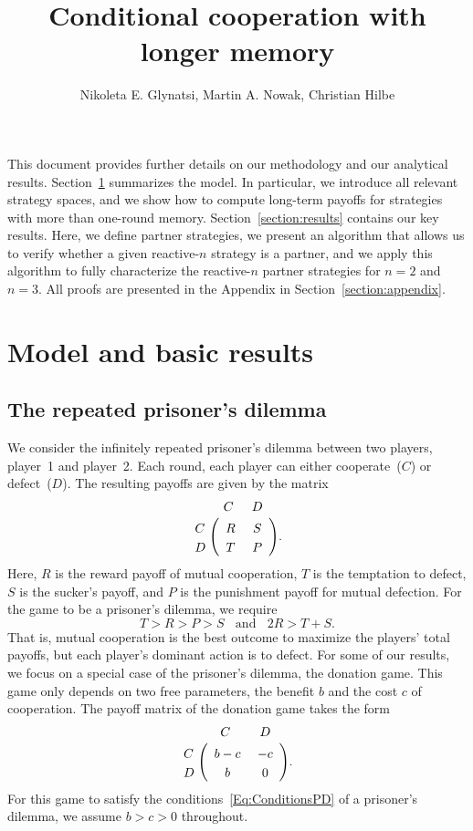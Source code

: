 \documentclass[9pt,twoside,lineno]{pnas-new}
\title{Conditional cooperation with longer memory}
\author{Nikoleta E. Glynatsi, Martin A. Nowak, Christian Hilbe}
\theoremstyle{plainCl1}
\theoremstyle{plainCl2}
\begin{document}
\maketitle

\SItext

This document provides further details on our methodology and our analytical
results.
Section~\ref{section:model} summarizes the model. 
In particular, we introduce all relevant strategy spaces, 
and we show how to compute long-term payoffs for strategies with more than one-round memory. 
Section~\ref{section:results} contains our key results. 
Here, we define partner strategies, we present an algorithm that allows us to verify whether a given reactive-$n$ strategy is a partner, and we apply this algorithm to fully characterize the reactive-$n$ partner strategies for $n\!=\!2$ and $n\!=\!3$.
All proofs are presented in the Appendix in Section~\ref{section:appendix}.

\section{Model and basic results}\label{section:model}

\subsection{The repeated prisoner's dilemma}


We consider the infinitely repeated prisoner's dilemma between two players, player~1 and player~2.
Each round, each player can either cooperate~($C$) or defect~($D$). 
The resulting payoffs are given by the matrix 
\begin{align}\label{Eq:PrisonerDilemma}
  \bordermatrix{%
    & C & D \cr
    C &\ R &\ S\  \cr
    D &\ T &\ P\ \cr
  }.
\end{align}
Here, $R$ is the reward payoff of mutual cooperation, $T$ is the temptation to defect, $S$ is the sucker's payoff, and $P$ is the punishment payoff for mutual defection. For the game to be a prisoner's dilemma, we require
\begin{equation} \label{Eq:ConditionsPD}
 T > R > P > S ~~~~\text{and}~~~~ 2 R > T \!+\! S. 
\end{equation}
That is, mutual cooperation is the best outcome to maximize the players' total payoffs, but each player's dominant action is to defect. 
For some of our results, we focus on a special case of the prisoner's dilemma, the donation game. 
This game only depends on two free parameters, the benefit $b$ and the cost $c$ of cooperation. 
The payoff matrix of the donation game takes the form
\begin{align} \label{Eq:DonationGame}
  \bordermatrix{%
    & C & D \cr
    C &\ b - c &\ -c\  \cr
    D &\ b &\ 0\ \cr
  }.
\end{align}
For this game to satisfy the conditions~\eqref{Eq:ConditionsPD} of a prisoner's dilemma, we assume $b\!>\!c\!>\!0$ throughout. 
\end{document}
